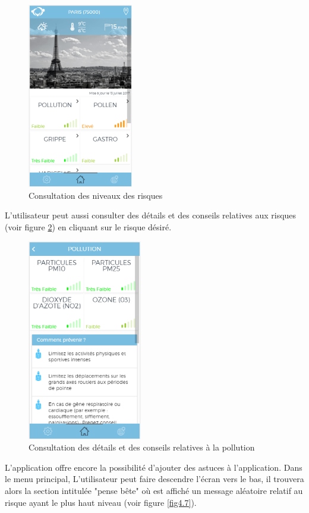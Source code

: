 \begin{figure}[!h]
	\begin{center}
		\includegraphics[width=4.6cm]{figures/dash_board}
	\end{center}
	\caption{Consultation des niveaux des risques}
	\label{fig4.5}
\end{figure}
\newpage
L'utilisateur peut aussi consulter des détails et des conseils relatives aux risques (voir figure \ref{fig4.6}) en cliquant sur le risque désiré.

\begin{figure}[!h]
	\begin{center}
		\includegraphics[width=5cm]{figures/detail_risk}
	\end{center}
	\caption{Consultation des détails et des conseils relatives à la pollution}
	\label{fig4.6}
\end{figure}

L'application offre encore la possibilité d'ajouter des astuces à l'application. Dans le menu principal, L'utilisateur peut faire descendre l'écran vers le bas, il trouvera alors la section intitulée "pense bête" où est affiché un message aléatoire relatif au risque ayant le plus haut niveau (voir figure \ref{fig4.7}).

